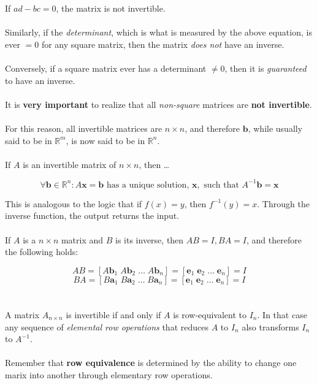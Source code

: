 \documentclass[12pt]{article}
\newcommand{\R}{\mathbb{R}}
\newcommand{\bt}[1]{\textbf{{#1}}}
\newcommand{\bm}[1]{\mathbf{{#1}}}
\begin{document}
If $ad - bc = 0$, the matrix is not invertible. \\ \\

Similarly, if the \emph{determinant}, which is what is measured by the above equation, is ever $= 0$ for any square matrix,
then the matrix \emph{does not} have an inverse. \\ \\

Conversely, if a square matrix ever has a determinant $\neq 0$, then it is \emph{guaranteed} to have an inverse. \\ \\

It is \textbf{very important} to realize that all \emph{non-square} matrices are \textbf{not invertible}. \\ \\

For this reason, all invertible matrices are $n \times n$, and therefore $\bt{b}$, while usually said to be in $\R^m$, is now said to be in $\R^n$. \\ \\

If $A$ is an invertible matrix of $n\times n$, then \dots

$$\forall \bm{b} \in \R^n: A\bm{x} = \bm{b}\textrm{ has a unique solution, } \bm{x}, \textrm{ such that } A^{-1}\bm{b} = \bm{x}$$

This is analogous to the logic that if $f(x) = y$, then $f^{-1}(y) = x$. Through the inverse function, the output returns the input. \\ \\

If $A$ is a $n \times n$ matrix and $B$ is its inverse, then $AB = I, BA = I$, and therefore the following holds:

$$AB = [A\bm{b}_1 \; A\bm{b}_2 \; \dots \; A\bm{b}_n] = [\bm{e}_1 \; \bm{e}_2 \; \dots \; \bm{e}_n] = I$$
$$BA = [B\bm{a}_1 \; B\bm{a}_2 \; \dots \; B\bm{a}_n] = [\bm{e}_1 \; \bm{e}_2 \; \dots \; \bm{e}_n] = I$$ \\ \\

A matrix $A_{n\times n}$ is invertible if and only if $A$ is row-equivalent to $I_n$. In that case any sequence of \emph{elemental row operations} that reduces $A$ to $I_n$ also
transforms $I_n$ to $A^{-1}$. \\ \\

Remember that \textbf{row equivalence} is determined by the ability to change
one marix into another through elementary row operations. \\ \\
\end{document}
